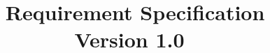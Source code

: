 \documentclass[12pt, letterpaper]{article}
\title{\TheProject\ Requirement Specification \\
Version 1.0}
\date{\TheDate}
\begin{document}
\begin{titlepage}
\maketitle
\end{titlepage}

\tableofcontents
\pagebreak


\pagebreak


\pagebreak


\pagebreak


\pagebreak


\pagebreak
\end{document}
